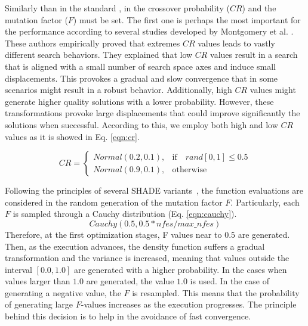 %
Similarly than in the standard \DE{}, in \DEEDM{} the crossover probability ($CR$) and the mutation factor ($F$) must be set.
%
The first one is perhaps the most important for the performance according to several studies developed by Montgomery 
et al. \cite{montgomery2010analysis}.
%
These authors empirically proved that extremes $CR$ values leads to vastly different search behaviors.
%
They explained that low $CR$ values result in a search that is aligned with a small number of search space axes and
induce small displacements.
%
This provokes a gradual and slow convergence that in some scenarios might result in a robust behavior.
%
Additionally, high $CR$ values might generate higher quality solutions with a lower probability.
%
However, these transformations provoke large displacements that could improve significantly the solutions when successful.
%
According to this, we employ both high and low $CR$ values as it is showed in Eq. \ref{eqn:cr}.

\begin{equation} \label{eqn:cr}
CR = 
\begin{cases}
     Normal(0.2, 0.1),& \text{if} \quad rand[0,1] \leq 0.5  \\
     Normal(0.9, 0.1),              & \text{otherwise}
\end{cases}
\end{equation}

Following the principles of several SHADE variants~\cite{awad2016ensemble, brest2016shade}, the function evaluations are considered in the random generation of the mutation factor $F$.
%
Particularly, each $F$ is sampled through a Cauchy distribution (Eq. \ref{eqn:cauchy}).
\begin{equation}\label{eqn:cauchy}
 Cauchy(0.5, 0.5*nfes/max\_nfes)
\end{equation}
%
Therefore, at the first optimization stages, F values near to $0.5$ are generated.
%
Then, as the execution advances, the density function suffers a gradual transformation and the variance is increased, meaning
that values outside the interval $[0.0, 1.0]$ are generated with a higher probability.
%
In the cases when values larger than $1.0$ are generated, the value $1.0$ is used.
%
In the case of generating a negative value, the $F$ is resampled.
%
This means that the probability of generating large $F$-values increases as the execution progresses.
%
The principle behind this decision is to help in the avoidance of fast convergence.


%


